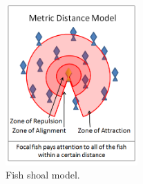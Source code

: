 \documentclass[12pt,A4]{article}
\begin{document}
\begin{figure}
\centering
\includegraphics[width=0.45\textwidth]{swarmfig.png}
\caption{\label{fig:swarm} Fish shoal model.}
\end{figure}
\end{document}
